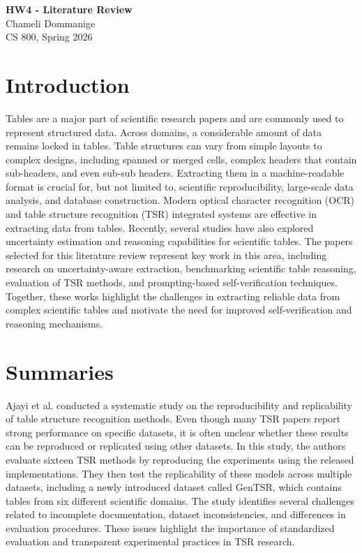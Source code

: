 \documentclass[12pt]{article}
\begin{document}
\begin{centering}
{\large\textbf{HW4 - Literature Review}}\\
\vspace{3mm} %
Chameli Dommanige\\
CS 800, Spring 2026\\
\end{centering}



\section{Introduction}
Tables are a major part of scientific research papers and are commonly used to represent structured data. Across domains, a considerable amount of data remains locked in tables. Table structures can vary from simple layouts to complex designs, including spanned or merged cells, complex headers that contain sub-headers, and even sub-sub headers. Extracting them in a machine-readable format is crucial for, but not limited to, scientific reproducibility, large-scale data analysis, and database construction. Modern optical character recognition (OCR) and table structure recognition (TSR) integrated systems are effective in extracting data from tables. Recently, several studies have also explored uncertainty estimation and reasoning capabilities for scientific tables. The papers selected for this literature review represent key work in this area, including research on uncertainty-aware extraction, benchmarking scientific table reasoning, evaluation of TSR methods, and prompting-based self-verification techniques. Together, these works highlight the challenges in extracting reliable data from complex scientific tables and motivate the need for improved self-verification and reasoning mechanisms.
\section{Summaries}

Ajayi et al. \cite{ajayi2023studyreproducibilityreplicabilitytable} conducted a systematic study on the reproducibility and replicability of table structure recognition methods. Even though many TSR papers report strong performance on specific datasets, it is often unclear whether these results can be reproduced or replicated using other datasets. In this study, the authors evaluate sixteen TSR methods by reproducing the experiments using the released implementations. They then test the replicability of these models across multiple datasets, including a newly introduced dataset called GenTSR, which contains tables from six different scientific domains. The study identifies several challenges related to incomplete documentation, dataset inconsistencies, and differences in evaluation procedures. These issues highlight the importance of standardized evaluation and transparent experimental practices in TSR research.
\end{document}
